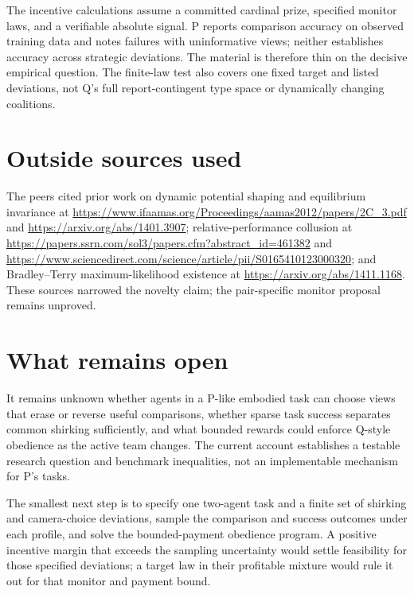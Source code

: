 \documentclass{article}
\begin{document}
The incentive calculations assume a committed cardinal prize, specified monitor laws, and a verifiable absolute signal. P reports comparison accuracy on observed training data and notes failures with uninformative views; neither establishes accuracy across strategic deviations. The material is therefore thin on the decisive empirical question. The finite-law test also covers one fixed target and listed deviations, not Q's full report-contingent type space or dynamically changing coalitions. 

\section*{Outside sources used}

The peers cited prior work on dynamic potential shaping and equilibrium invariance at \url{https://www.ifaamas.org/Proceedings/aamas2012/papers/2C_3.pdf} and \url{https://arxiv.org/abs/1401.3907}; relative-performance collusion at \url{https://papers.ssrn.com/sol3/papers.cfm?abstract_id=461382} and \url{https://www.sciencedirect.com/science/article/pii/S0165410123000320}; and Bradley--Terry maximum-likelihood existence at \url{https://arxiv.org/abs/1411.1168}. These sources narrowed the novelty claim; the pair-specific monitor proposal remains unproved. 

\section*{What remains open}

It remains unknown whether agents in a P-like embodied task can choose views that erase or reverse useful comparisons, whether sparse task success separates common shirking sufficiently, and what bounded rewards could enforce Q-style obedience as the active team changes. The current account establishes a testable research question and benchmark inequalities, not an implementable mechanism for P's tasks. 

The smallest next step is to specify one two-agent task and a finite set of shirking and camera-choice deviations, sample the comparison and success outcomes under each profile, and solve the bounded-payment obedience program. A positive incentive margin that exceeds the sampling uncertainty would settle feasibility for those specified deviations; a target law in their profitable mixture would rule it out for that monitor and payment bound. 
\end{document}

